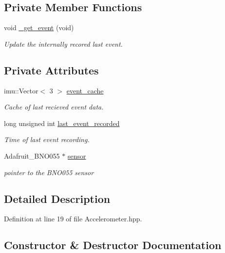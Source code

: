 \subsection*{Private Member Functions}
\begin{DoxyCompactItemize}
\item 
void \hyperlink{class_accelerometer_a0a5be85959063e5bc2092668b59b9b97}{\+\_\+get\+\_\+event} (void)
\begin{DoxyCompactList}\small\item\em Update the internally recored last event. \end{DoxyCompactList}\end{DoxyCompactItemize}
\subsection*{Private Attributes}
\begin{DoxyCompactItemize}
\item 
imu\+::\+Vector$<$ 3 $>$ \hyperlink{class_accelerometer_a179b04d61746127f9264ce87ba6e20ce}{event\+\_\+cache}
\begin{DoxyCompactList}\small\item\em Cache of last recieved event data. \end{DoxyCompactList}\item 
long unsigned int \hyperlink{class_accelerometer_a9cf8cf4caf6e866bc2b3e473155f6731}{last\+\_\+event\+\_\+recorded}
\begin{DoxyCompactList}\small\item\em Time of last event recording. \end{DoxyCompactList}\item 
Adafruit\+\_\+\+B\+N\+O055 $\ast$ \hyperlink{class_accelerometer_a0dbf3aed48d0d0d9a16511c628ed2cba}{sensor}
\begin{DoxyCompactList}\small\item\em pointer to the B\+N\+O055 sensor \end{DoxyCompactList}\end{DoxyCompactItemize}


\subsection{Detailed Description}


Definition at line 19 of file Accelerometer.\+hpp.



\subsection{Constructor \& Destructor Documentation}
\mbox{\label{class_accelerometer_abf2355ca82838b64d7e4f00b0c23e65e}} 

